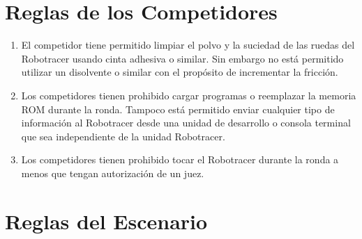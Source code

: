 \section{Reglas de los Competidores}

\begin{enumerate}
  \item El competidor tiene permitido limpiar el polvo y la suciedad de las ruedas del Robotracer usando cinta adhesiva o similar. Sin embargo no está permitido utilizar un disolvente o similar con el propósito de incrementar la fricción.

  \item Los competidores tienen prohibido cargar programas o reemplazar la memoria ROM durante la ronda. Tampoco está permitido enviar cualquier tipo de información al Robotracer desde una unidad de desarrollo o consola terminal que sea independiente de la unidad Robotracer.

  \item Los competidores tienen prohibido tocar el Robotracer durante la ronda a menos que tengan autorización de un juez.
\end{enumerate}

\section{Reglas del Escenario}

